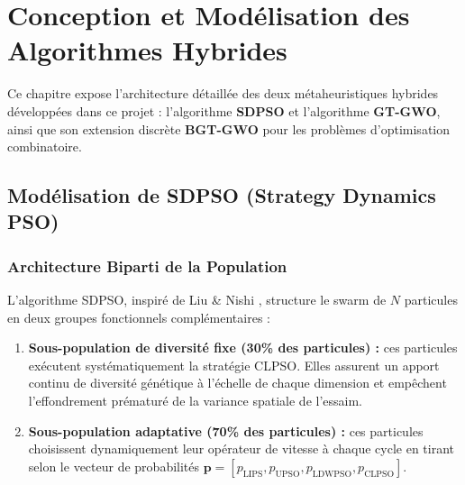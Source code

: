 \chapter{Conception et Modélisation des Algorithmes Hybrides}
\label{chap:conception}

Ce chapitre expose l'architecture détaillée des deux métaheuristiques hybrides développées dans ce projet : l'algorithme \textbf{SDPSO} et l'algorithme \textbf{GT-GWO}, ainsi que son extension discrète \textbf{BGT-GWO} pour les problèmes d'optimisation combinatoire.

\section{Modélisation de SDPSO (Strategy Dynamics PSO)}

\subsection{Architecture Biparti de la Population}
L'algorithme SDPSO, inspiré de Liu \& Nishi \cite{liu2022strategy}, structure le swarm de $N$ particules en deux groupes fonctionnels complémentaires :
\begin{enumerate}[label=\textbf{\arabic*.}]
    \item \textbf{Sous-population de diversité fixe (30\% des particules) :} ces particules exécutent systématiquement la stratégie CLPSO. Elles assurent un apport continu de diversité génétique à l'échelle de chaque dimension et empêchent l'effondrement prématuré de la variance spatiale de l'essaim.
    \item \textbf{Sous-population adaptative (70\% des particules) :} ces particules choisissent dynamiquement leur opérateur de vitesse à chaque cycle en tirant selon le vecteur de probabilités $\mathbf{p} = [p_{\text{LIPS}}, p_{\text{UPSO}}, p_{\text{LDWPSO}}, p_{\text{CLPSO}}]$.
\end{enumerate}


